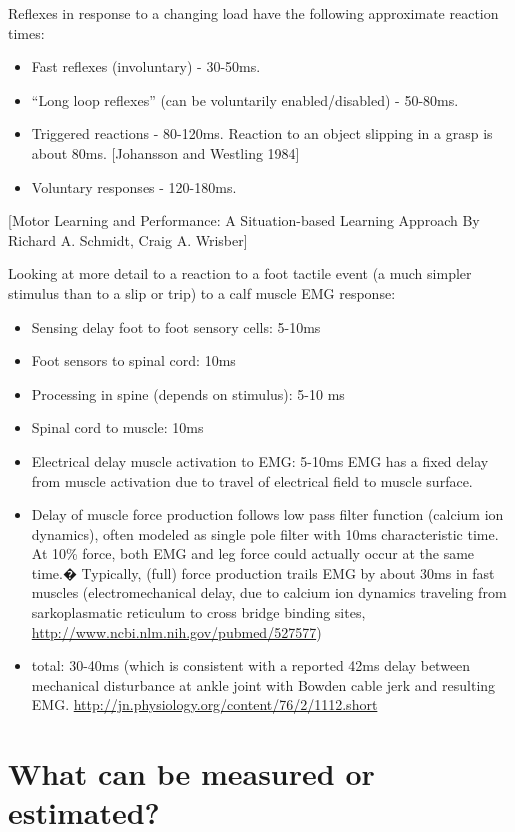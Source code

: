 \documentclass[letterpaper,12pt,fullpage]{article}
\begin{document}
Reflexes in response to a changing load have the following approximate reaction times:
\begin{itemize}
\item
Fast reflexes (involuntary) - 30-50ms.
\item
``Long loop reflexes'' (can be voluntarily enabled/disabled) - 50-80ms.
\item
Triggered reactions - 80-120ms.
Reaction to an object slipping in a grasp is about 80ms.
[Johansson and Westling 1984]
\item
Voluntary responses - 120-180ms.
\end{itemize}
[Motor Learning and Performance: A Situation-based Learning Approach
 By Richard A. Schmidt, Craig A. Wrisber]

Looking at more detail to a reaction to a foot tactile event (a much
simpler stimulus than to a slip or trip)
to a calf muscle EMG response:
\begin{itemize}
\item
Sensing delay foot to foot sensory cells: 5-10ms
\item
Foot sensors to spinal cord: 10ms 
\item
Processing in spine (depends on stimulus): 5-10 ms
\item
Spinal cord to muscle: 10ms 
\item
Electrical delay muscle activation to EMG: 5-10ms
EMG has a fixed delay from muscle activation due to
travel of electrical field to muscle surface.
\item
Delay
of muscle force production follows low pass filter function (calcium
ion dynamics), often modeled as single pole filter with 10ms
characteristic time. At 10\% force, both EMG and leg force could
actually occur at the same time.�
Typically, (full) force production trails EMG by about 30ms in fast
muscles (electromechanical delay, due to calcium ion dynamics
traveling from sarkoplasmatic reticulum to cross bridge binding
sites, \url{http://www.ncbi.nlm.nih.gov/pubmed/527577})
\item
total: 30-40ms (which is consistent with a reported 42ms delay
between mechanical disturbance at ankle joint with Bowden cable jerk
and resulting EMG.
\url{http://jn.physiology.org/content/76/2/1112.short}
\end{itemize}

\section{What can be measured or estimated?}
\end{document}
